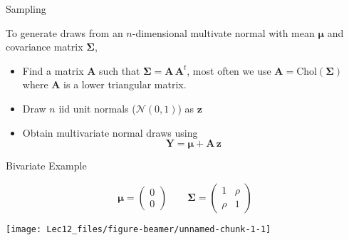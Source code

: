 \documentclass[11pt,ignorenonframetext,]{beamer}
\providecommand{\tightlist}{%
  \setlength{\itemsep}{0pt}\setlength{\parskip}{0pt}}
\begin{document}
\begin{frame}[t]{Sampling}
\protect\hypertarget{sampling}{}

To generate draws from an \(n\)-dimensional multivate normal with mean
\(\symbf{\mu}\) and covariance matrix \(\symbf{\Sigma}\),

\vspace{4mm}

\pause

\begin{itemize}
\tightlist
\item
  Find a matrix \(\symbf{A}\) such that
  \(\symbf{\Sigma} = \symbf{A}\,\symbf{A}^t\), most often we use
  \(\symbf{A} = \text{Chol}(\symbf{\Sigma})\) where \(\symbf{A}\) is a
  lower triangular matrix.
\end{itemize}

\pause

\vspace{2mm}

\begin{itemize}
\tightlist
\item
  Draw \(n\) iid unit normals (\(\mathcal{N}(0,1)\)) as \(\symbf{z}\)
\end{itemize}

\pause

\vspace{2mm}

\begin{itemize}
\tightlist
\item
  Obtain multivariate normal draws using
  \[ \symbf{Y} = \symbf{\mu} + \symbf{A} \, \symbf{z} \]
\end{itemize}

\end{frame}

\begin{frame}{Bivariate Example}
\protect\hypertarget{bivariate-example}{}

\scriptsize

\[ \symbf{\mu} = \begin{pmatrix}0 \\ 0\end{pmatrix} \qquad \symbf{\Sigma} = \begin{pmatrix}1 & \rho \\ \rho & 1 \end{pmatrix}\]

\begin{center}\texttt{[image: Lec12\_files/figure-beamer/unnamed-chunk-1-1]} \end{center}

\end{frame}
\end{document}
